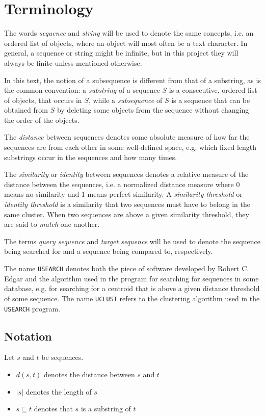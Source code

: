 \section{Terminology}

The words \emph{sequence} and \emph{string} will be used to denote the same
concepts, i.e. an ordered list of objects, where an object will most often be a
text character. In general, a sequence or string might be infinite, but in this
project they will always be finite unless mentioned otherwise.

In this text, the notion of a subsequence is different from that of a
substring, as is the common convention: a \emph{substring} of a sequence $S$ is
a consecutive, ordered list of objects, that occurs in $S$, while a
\emph{subsequence} of $S$ is a sequence that can be obtained from $S$ by
deleting some objects from the sequence without changing the order of the
objects.

The \emph{distance} between sequences denotes some absolute measure of how far
the sequences are from each other in some well-defined space, e.g. which fixed
length substrings occur in the sequences and how many times.

The \emph{similarity} or \emph{identity} between sequences denotes a relative
measure of the distance between the sequences, i.e. a normalized distance
measure where 0 means no similarity and 1 means perfect similarity. A
\emph{similarity threshold} or \emph{identity threshold} is a similarity that
two sequences must have to belong in the same cluster.  When two sequences are
above a given similarity threshold, they are said to \emph{match} one another.

The terms \emph{query sequence} and \emph{target sequence} will be used to
denote the sequence being searched for and a sequence being compared to,
respectively.

The name \texttt{USEARCH} denotes both the piece of software developed by
Robert C. Edgar and the algorithm used in the program for searching for
sequences in some database, e.g. for searching for a centroid that is above a
given distance threshold of some sequence. The name \texttt{UCLUST} refers to
the clustering algorithm used in the \texttt{USEARCH} program.


\subsection{Notation}

Let $s$ and $t$ be sequences.
\begin{itemize}
  \item $d(s,t)$ denotes the distance between $s$ and $t$
  \item $|s|$ denotes the length of $s$
  \item $s \sqsubseteq t$ denotes that $s$ is a substring of $t$
\end{itemize}
